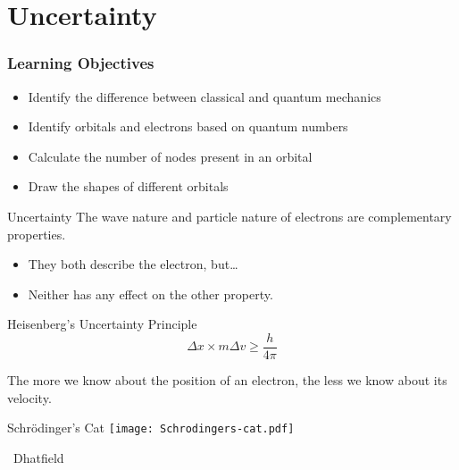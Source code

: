 \documentclass[handout,notes=hide]{beamer}
\begin{document}
\section{Uncertainty}

\begin{frame}
	\frametitle{Learning Objectives}
	\begin{itemize}
		\item Identify the difference between classical and quantum
			mechanics
		\item Identify orbitals and electrons based on quantum numbers
		\item Calculate the number of nodes present in an orbital
		\item Draw the shapes of different orbitals
	\end{itemize}
\end{frame}


\begin{frame}{Uncertainty}
	The wave nature and particle nature of electrons are
	\alert{complementary properties}.
	\begin{itemize}
		\item They both describe the electron, but\ldots
		\item Neither has any effect on the other property.
	\end{itemize}

	\begin{block}{Heisenberg's Uncertainty Principle}
		\begin{equation*}
			\Delta x \times m \Delta v \geq \frac{h}{4\pi}
		\end{equation*}

		The more we know about the position of an electron, the less we
		know about its velocity.
	\end{block}
\end{frame}

\begin{frame}{Schrödinger's Cat}
	\centering
	\texttt{[image: Schrodingers-cat.pdf]}

	\footnotesize \ccbysa\ Dhatfield
\end{frame}
\end{document}
